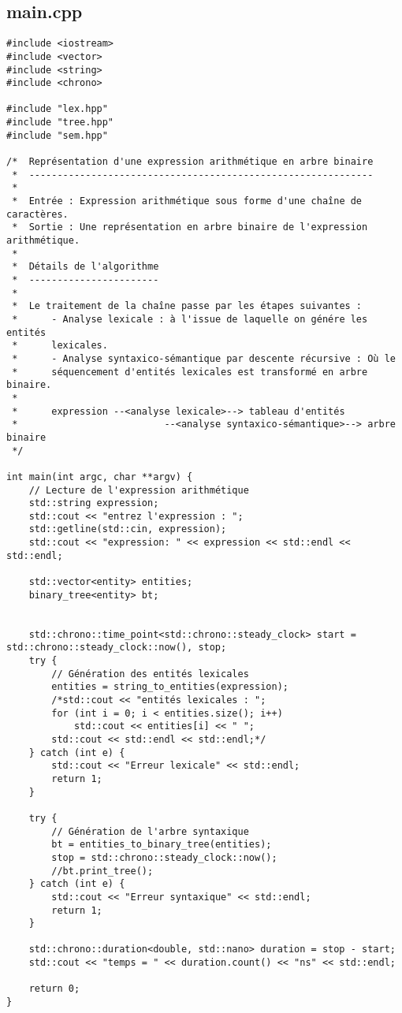 \subsection{main.cpp}
\begin{verbatim}
#include <iostream>
#include <vector>
#include <string>
#include <chrono>

#include "lex.hpp"
#include "tree.hpp"
#include "sem.hpp"

/*  Représentation d'une expression arithmétique en arbre binaire
 *  -------------------------------------------------------------
 *
 *  Entrée : Expression arithmétique sous forme d'une chaîne de caractères.
 *  Sortie : Une représentation en arbre binaire de l'expression arithmétique.
 *
 *  Détails de l'algorithme
 *  -----------------------
 *
 *  Le traitement de la chaîne passe par les étapes suivantes :
 *      - Analyse lexicale : à l'issue de laquelle on génére les entités 
 *      lexicales.
 *      - Analyse syntaxico-sémantique par descente récursive : Où le 
 *      séquencement d'entités lexicales est transformé en arbre binaire.
 *
 *      expression --<analyse lexicale>--> tableau d'entités 
 *                          --<analyse syntaxico-sémantique>--> arbre binaire
 */

int main(int argc, char **argv) {
    // Lecture de l'expression arithmétique
    std::string expression;
    std::cout << "entrez l'expression : ";
    std::getline(std::cin, expression);
    std::cout << "expression: " << expression << std::endl << std::endl;

    std::vector<entity> entities;
    binary_tree<entity> bt;


    std::chrono::time_point<std::chrono::steady_clock> start = std::chrono::steady_clock::now(), stop;
    try {
        // Génération des entités lexicales
        entities = string_to_entities(expression);
        /*std::cout << "entités lexicales : ";
        for (int i = 0; i < entities.size(); i++)
            std::cout << entities[i] << " ";
        std::cout << std::endl << std::endl;*/
    } catch (int e) {
        std::cout << "Erreur lexicale" << std::endl;
        return 1;
    }

    try {
        // Génération de l'arbre syntaxique
        bt = entities_to_binary_tree(entities); 
        stop = std::chrono::steady_clock::now(); 
        //bt.print_tree();
    } catch (int e) {
        std::cout << "Erreur syntaxique" << std::endl;
        return 1;
    }

    std::chrono::duration<double, std::nano> duration = stop - start;
    std::cout << "temps = " << duration.count() << "ns" << std::endl;

    return 0;
}
\end{verbatim}

